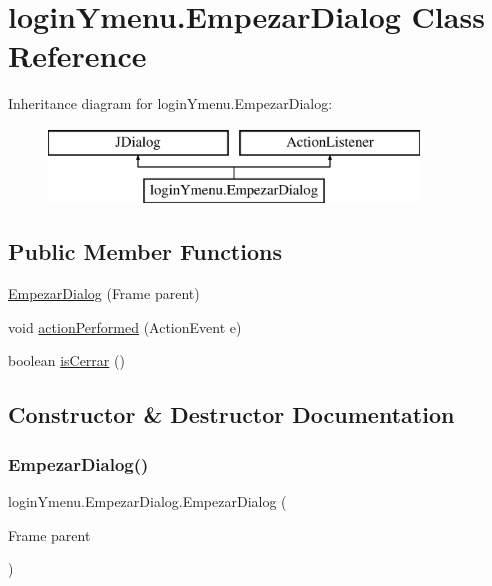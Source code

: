 \hypertarget{classlogin_ymenu_1_1_empezar_dialog}{}\section{login\+Ymenu.\+Empezar\+Dialog Class Reference}
\label{classlogin_ymenu_1_1_empezar_dialog}
Inheritance diagram for login\+Ymenu.\+Empezar\+Dialog\+:\begin{figure}[H]
\begin{center}
\leavevmode
\includegraphics[height=2.000000cm]{classlogin_ymenu_1_1_empezar_dialog}
\end{center}
\end{figure}
\subsection*{Public Member Functions}
\begin{DoxyCompactItemize}
\item 
\mbox{\hyperlink{classlogin_ymenu_1_1_empezar_dialog_a00885fe1d83dffeb79f48e0e6ec8f95e}{Empezar\+Dialog}} (Frame parent)
\item 
void \mbox{\hyperlink{classlogin_ymenu_1_1_empezar_dialog_a0ac5c0c2561177190821db28d5053d30}{action\+Performed}} (Action\+Event e)
\item 
boolean \mbox{\hyperlink{classlogin_ymenu_1_1_empezar_dialog_a011cc7f3705056aa9fe4269e1d464787}{is\+Cerrar}} ()
\end{DoxyCompactItemize}


\subsection{Constructor \& Destructor Documentation}
\mbox{\label{classlogin_ymenu_1_1_empezar_dialog_a00885fe1d83dffeb79f48e0e6ec8f95e}} 
\subsubsection{\texorpdfstring{Empezar\+Dialog()}{EmpezarDialog()}}
{\footnotesize\ttfamily login\+Ymenu.\+Empezar\+Dialog.\+Empezar\+Dialog (\begin{DoxyParamCaption}\item[{Frame}]{parent }\end{DoxyParamCaption})}



